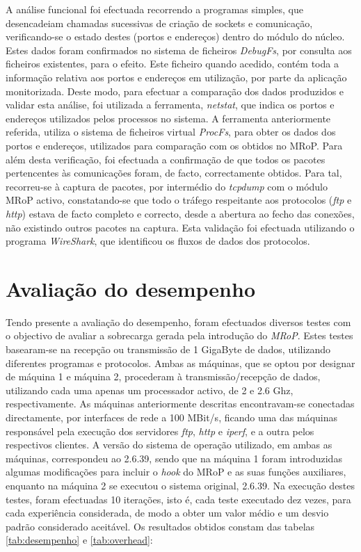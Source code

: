 A análise funcional foi efectuada recorrendo a programas simples, que desencadeiam chamadas sucessivas de criação de sockets e comunicação, verificando-se o estado destes (portos e endereços) dentro do módulo do núcleo.
Estes dados foram confirmados no sistema de ficheiros \textit{DebugFs}, por consulta aos ficheiros existentes, para o efeito.
Este ficheiro quando acedido, contém toda a informação relativa aos portos e endereços em utilização, por parte da aplicação monitorizada.
Deste modo, para efectuar a comparação dos dados produzidos e validar esta análise, foi utilizada a ferramenta, \textit{netstat}, que indica os portos e endereços utilizados pelos processos no sistema.
A ferramenta anteriormente referida, utiliza o sistema de ficheiros virtual \textit{ProcFs}, para obter os dados dos portos e endereços, utilizados para comparação com os obtidos no MRoP.
Para além desta verificação, foi efectuada a confirmação de que todos os pacotes pertencentes às comunicações foram, de facto, correctamente obtidos.
Para tal, recorreu-se à captura de pacotes, por intermédio do \textit{tcpdump} com o módulo MRoP activo, constatando-se que todo o tráfego respeitante aos protocolos (\textit{ftp} e \textit{http}) estava de facto completo e correcto, desde a abertura ao fecho das conexões, não existindo outros pacotes na captura.
Esta validação foi efectuada utilizando o programa \textit{WireShark}, que identificou os fluxos de dados dos protocolos.


\section{Avaliação do desempenho}
\label{sec:eval_performance}

Tendo presente a avaliação do desempenho, foram efectuados diversos testes com o objectivo de avaliar a sobrecarga gerada pela introdução do \textit{MRoP}.
Estes testes basearam-se na recepção ou transmissão de 1 GigaByte de dados, utilizando diferentes programas e protocolos.
Ambas as máquinas, que se optou por designar de máquina 1 e máquina 2, procederam à transmissão/recepção de dados, utilizando cada uma apenas um processador activo, de 2 e 2.6 Ghz, respectivamente.
As máquinas anteriormente descritas encontravam-se conectadas directamente, por interfaces de rede a 100 MBit/s, ficando uma das máquinas responsável pela execução dos servidores \textit{ftp}, \textit{http} e \textit{iperf}, e a outra pelos respectivos clientes.
A versão do sistema de operação utilizado, em ambas as máquinas, correspondeu ao 2.6.39, sendo que na máquina 1 foram introduzidas algumas modificações para incluir o \textit{hook} do MRoP e as suas funções auxiliares, enquanto na máquina 2 se executou o sistema original, 2.6.39.
Na execução destes testes, foram efectuadas 10 iterações, isto é, cada teste executado dez vezes, para cada experiência considerada, de modo a obter um valor médio e um desvio padrão considerado aceitável.
Os resultados obtidos constam das tabelas \ref{tab:desempenho} e \ref{tab:overhead}:

